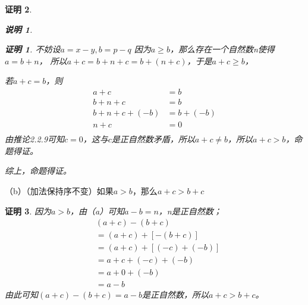 \documentclass{article}
\theoremstyle{mystyle}
\newtheorem*{zremark}{说明}
\theoremstyle{zproofstyle}
\newtheorem*{zproof}{证明}
\begin{document}
\begin{zproof}
\begin{zgraytheorem}
\begin{zremark}
      \begin{zproof}
        不妨设$a=x-y,b=p-q$
        因为$a \geq b$，那么存在一个自然数n使得$a = b + n$，
        所以$a + c = b + n + c = b + (n + c)$，于是$a + c \geq b$，

        若$a+c=b$，则
        \begin{align*}
          a + c            & = b        \\
          b + n + c        & = b        \\
          b + n + c + (-b) & = b + (-b) \\
          n + c            & = 0        \\
        \end{align*}
        由推论2.2.9可知$c=0$，这与$c$是正自然数矛盾，所以$a+c \neq b$，所以$a + c > b$，命题得证。
      \end{zproof}
    \end{zremark}
  \end{zgraytheorem}

  综上，命题得证。
\end{zproof}

（b）（加法保持序不变）如果$a > b$，那么$a + c > b + c$

\begin{zproof}
  因为$a>b$，由（a）可知$a-b=n$，n是正自然数；
  \begin{align*}
     & (a+c) - (b+c)        \\
     & =(a+c) + [-(b+c)]    \\
     & =(a+c) + [(-c)+(-b)] \\
     & =a + c + (-c) + (-b) \\
     & =a + 0 + (-b)        \\
     & =a - b
  \end{align*}
  由此可知$(a+c) - (b+c)=a - b$是正自然数，所以$a + c > b + c$。
\end{zproof}
\end{document}
